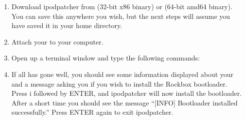 \begin{enumerate}

\item Download ipodpatcher from
 (32-bit x86 
binary) or  
(64-bit amd64 binary). You can save this anywhere you wish, but the next 
steps will assume you have saved it in your home directory.

\item Attach your \dap{} to your computer.

\item Open up a terminal window and type the following commands:



\item If all has gone well, you should see some information displayed about
your \dap{} and a message asking you if you wish to install the Rockbox
bootloader. Press i followed by ENTER, and ipodpatcher will now install the
bootloader. After a short time you should see the message ``[INFO] Bootloader
installed successfully.'' Press ENTER again to exit ipodpatcher.

\end{enumerate}
